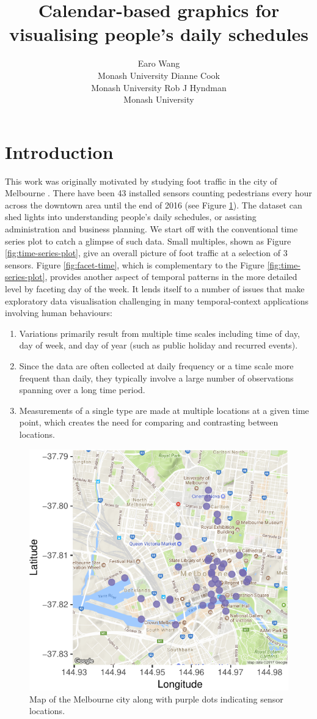 \documentclass[article]{jss}
\author{
Earo Wang\\Monash University \And Dianne Cook\\Monash University \And Rob J Hyndman\\Monash University
}
\title{Calendar-based graphics for visualising people's daily schedules}
\providecommand{\tightlist}{%
  \setlength{\itemsep}{0pt}\setlength{\parskip}{0pt}}
\begin{document}
\section{Introduction}\label{introduction}

This work was originally motivated by studying foot traffic in the city
of Melbourne \citep{ped}. There have been 43 installed sensors counting
pedestrians every hour across the downtown area until the end of 2016
(see Figure \ref{fig:ped-map}). The dataset can shed lights into
understanding people's daily schedules, or assisting administration and
business planning. We start off with the conventional time series plot
to catch a glimpse of such data. Small multiples, shown as Figure
\ref{fig:time-series-plot}, give an overall picture of foot traffic at a
selection of 3 sensors. Figure \ref{fig:facet-time}, which is
complementary to the Figure \ref{fig:time-series-plot}, provides another
aspect of temporal patterns in the more detailed level by faceting day
of the week. It lends itself to a number of issues that make exploratory
data visualisation challenging in many temporal-context applications
involving human behaviours:

\begin{enumerate}
\def\labelenumi{\arabic{enumi}.}
\tightlist
\item
  Variations primarily result from multiple time scales including time
  of day, day of week, and day of year (such as public holiday and
  recurred events).
\item
  Since the data are often collected at daily frequency or a time scale
  more frequent than daily, they typically involve a large number of
  observations spanning over a long time period.
\item
  Measurements of a single type are made at multiple locations at a
  given time point, which creates the need for comparing and contrasting
  between locations.
\end{enumerate}

\begin{CodeChunk}
\begin{figure}

{\centering \includegraphics[width=0.55\linewidth]{figure/ped-map-1} 

}

\caption[Map of the Melbourne city along with purple dots indicating sensor locations]{Map of the Melbourne city along with purple dots indicating sensor locations.}\label{fig:ped-map}
\end{figure}
\end{CodeChunk}
\end{document}
